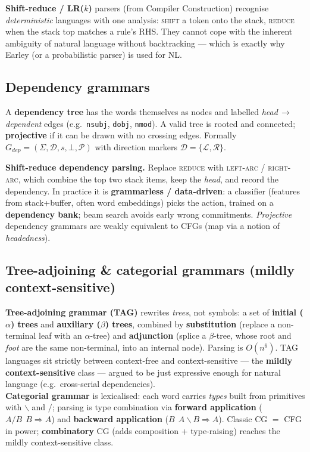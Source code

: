 \documentclass[11pt,a4paper]{article}
\begin{document}
\begin{useful}
\textbf{Shift-reduce / LR($k$)} parsers (from Compiler Construction) recognise \emph{deterministic} languages with one analysis: \textsc{shift} a token onto the stack, \textsc{reduce} when the stack top matches a rule's RHS. They cannot cope with the inherent ambiguity of natural language without backtracking --- which is exactly why Earley (or a probabilistic parser) is used for NL.
\end{useful}

\subsection{Dependency grammars}

A \textbf{dependency tree} has the words themselves as nodes and labelled \emph{head\,$\to$\,dependent} edges (e.g.\ \texttt{nsubj}, \texttt{dobj}, \texttt{nmod}). A valid tree is rooted and connected; \textbf{projective} if it can be drawn with no crossing edges. Formally $G_{dep}=(\Sigma,\mathcal D,s,\bot,\mathcal P)$ with direction markers $\mathcal D=\{\mathcal L,\mathcal R\}$.

\begin{useful}
\textbf{Shift-reduce dependency parsing.} Replace \textsc{reduce} with \textsc{left-arc} / \textsc{right-arc}, which combine the top two stack items, keep the \emph{head}, and record the dependency. In practice it is \textbf{grammarless / data-driven}: a classifier (features from stack+buffer, often word embeddings) picks the action, trained on a \textbf{dependency bank}; beam search avoids early wrong commitments. \emph{Projective} dependency grammars are weakly equivalent to CFGs (map via a notion of \emph{headedness}).
\end{useful}

\subsection{Tree-adjoining \& categorial grammars (mildly context-sensitive)}

\begin{useful}
\textbf{Tree-adjoining grammar (TAG)} rewrites \emph{trees}, not symbols: a set of \textbf{initial ($\alpha$) trees} and \textbf{auxiliary ($\beta$) trees}, combined by \textbf{substitution} (replace a non-terminal leaf with an $\alpha$-tree) and \textbf{adjunction} (splice a $\beta$-tree, whose root and \emph{foot} are the same non-terminal, into an internal node). Parsing is $O(n^6)$. TAG languages sit strictly between context-free and context-sensitive --- the \textbf{mildly context-sensitive} class --- argued to be just expressive enough for natural language (e.g.\ cross-serial dependencies).\\[3pt]
\textbf{Categorial grammar} is lexicalised: each word carries \emph{types} built from primitives with $\backslash$ and $/$; parsing is type combination via \textbf{forward application} ($A/B\ \ B\Rightarrow A$) and \textbf{backward application} ($B\ \ A\backslash B\Rightarrow A$). Classic CG $=$ CFG in power; \textbf{combinatory} CG (adds composition + type-raising) reaches the mildly context-sensitive class.
\end{useful}
\end{document}

